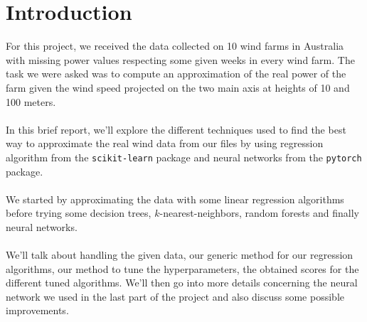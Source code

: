\section{Introduction}

For this project, we received the data collected on 10 wind farms in Australia with missing power values respecting some given weeks in every wind farm. The task we were asked was to compute an approximation of the real power of the farm given the wind speed projected on the two main axis at heights of 10 and 100 meters. 
\paragraph{}
In this brief report, we'll explore the different techniques used to find the best way to approximate the real wind data from our files by using regression algorithm from the \verb|scikit-learn| package and neural networks from the \verb|pytorch| package.
\paragraph{}
We started by approximating the data with some linear regression algorithms before trying some decision trees, $k$-nearest-neighbors, random forests and finally neural networks.
\paragraph{}
We'll talk about handling the given data, our generic method for our regression algorithms, our method to tune the hyperparameters, the obtained scores for the different tuned algorithms. We'll then go into more details concerning the neural network we used in the last part of the project and also discuss some possible improvements.